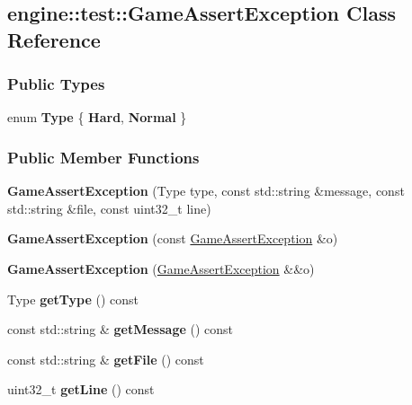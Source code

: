 \hypertarget{a00039}{}\subsection{engine\+:\+:test\+:\+:Game\+Assert\+Exception Class Reference}
\label{a00039}
\subsubsection*{Public Types}
\begin{DoxyCompactItemize}
\item 
enum {\bfseries Type} \{ {\bfseries Hard}, 
{\bfseries Normal}
 \}\hypertarget{a00039_adb341c9f0035716e556fbbb858815562}{}\label{a00039_adb341c9f0035716e556fbbb858815562}

\end{DoxyCompactItemize}
\subsubsection*{Public Member Functions}
\begin{DoxyCompactItemize}
\item 
{\bfseries Game\+Assert\+Exception} (Type type, const std\+::string \&message, const std\+::string \&file, const uint32\+\_\+t line)\hypertarget{a00039_a67de0ef29f112f3ad99e5cf1f59639c5}{}\label{a00039_a67de0ef29f112f3ad99e5cf1f59639c5}

\item 
{\bfseries Game\+Assert\+Exception} (const \hyperlink{a00039}{Game\+Assert\+Exception} \&o)\hypertarget{a00039_a5d45ad5614324c6ff6288095c49bef86}{}\label{a00039_a5d45ad5614324c6ff6288095c49bef86}

\item 
{\bfseries Game\+Assert\+Exception} (\hyperlink{a00039}{Game\+Assert\+Exception} \&\&o)\hypertarget{a00039_a0adcc77c72447b144af620a848786c08}{}\label{a00039_a0adcc77c72447b144af620a848786c08}

\item 
Type {\bfseries get\+Type} () const \hypertarget{a00039_af7c02390f1a36a2ef5b503daaa71b26c}{}\label{a00039_af7c02390f1a36a2ef5b503daaa71b26c}

\item 
const std\+::string \& {\bfseries get\+Message} () const \hypertarget{a00039_a9c691825de7209dda1afa81ab96c24f9}{}\label{a00039_a9c691825de7209dda1afa81ab96c24f9}

\item 
const std\+::string \& {\bfseries get\+File} () const \hypertarget{a00039_a42c238d2506f39c71b132fd5434afcfe}{}\label{a00039_a42c238d2506f39c71b132fd5434afcfe}

\item 
uint32\+\_\+t {\bfseries get\+Line} () const \hypertarget{a00039_a2a42499a575063750e93d8f477b00682}{}\label{a00039_a2a42499a575063750e93d8f477b00682}

\end{DoxyCompactItemize}


